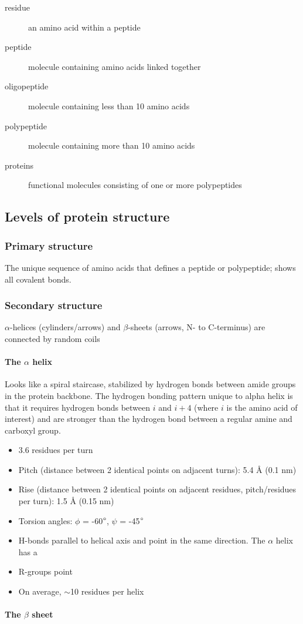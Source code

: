 \documentclass[letterpaper, 12pt]{article}
\begin{document}
\begin{description}
\item [residue] an amino acid within a peptide
\item [peptide] molecule containing amino acids linked together
\item [oligopeptide] molecule containing less than 10 amino acids
\item [polypeptide] molecule containing more than 10 amino acids
\item [proteins] functional molecules consisting of one or more polypeptides
\end{description}

\subsection*{Levels of protein structure}

\subsubsection*{Primary structure}
The unique sequence of amino acids that defines a peptide or polypeptide; shows all covalent bonds.

\subsubsection*{Secondary structure}
$\alpha$-helices (cylinders/arrows) and $\beta$-sheets (arrows, N- to C-terminus) are connected by random coils

\paragraph{The $\alpha$ helix} Looks like a spiral staircase, stabilized by hydrogen bonds between amide groups in the protein backbone. The hydrogen bonding pattern unique to alpha helix is that it requires hydrogen bonds between $i$ and $i+4$ (where $i$ is the amino acid of interest) and are stronger than the hydrogen bond between a regular amine and carboxyl group.

\begin{itemize}
\item 3.6 residues per turn
\item Pitch (distance between 2 identical points on adjacent turns): 5.4 Å (0.1 nm)
\item Rise (distance between 2 identical points on adjacent residues, pitch/residues per turn): 1.5 Å (0.15 nm)
\item Torsion angles: $\phi$ = -60$\degree$, $\psi$ = -45$\degree$
\item H-bonds parallel to helical axis and point in the same direction. The $\alpha$ helix has a
\item R-groups point
\item On average, $\sim$10 residues per helix
\end{itemize}

\paragraph{The $\beta$ sheet}
\end{document}
